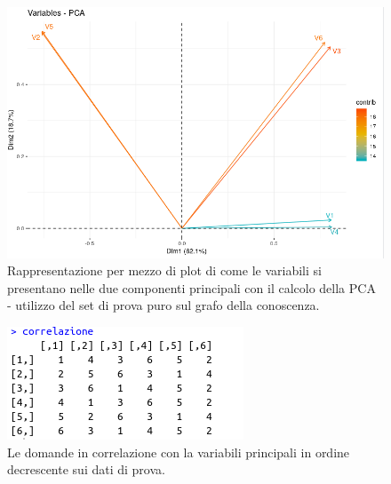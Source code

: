 \begin{figure}[H]
\centering
	\includegraphics[width=0.80\linewidth]{../../PCA/plot/PCA.png}
	\caption{Rappresentazione per mezzo di plot di come le variabili si presentano nelle due componenti principali con il calcolo della PCA - utilizzo del set di prova puro sul grafo della conoscenza.}
	\label{Rappresentazione per mezzo di plot di come le variabili si presentano nelle due componenti principali con il calcolo della PCA - utilizzo del set di prova puro sul grafo della conoscenza.}
\end{figure}

\begin{figure}[H]
\centering
	\includegraphics[width=0.60\linewidth]{../../PCA/plot/correlazione_base.png}
	\caption{Le domande in correlazione con la variabili principali in ordine decrescente sui dati di prova.}
	\label{Le domande in correlazione con la variabili principali in ordine decrescente sui dati di prova.}
\end{figure}


